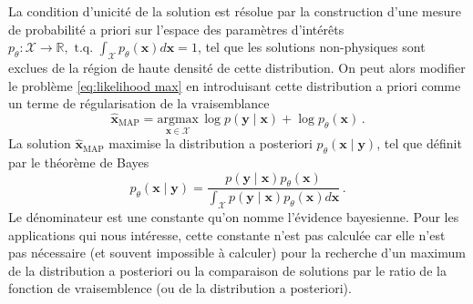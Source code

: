 

La condition d'unicité de la solution est résolue par la construction d'une
mesure de probabilité a priori sur l'espace des paramètres d'intérêts 
$p_\theta: \mathcal{X} \rightarrow \mathbb{R}, \,\, \mathrm{t.q.}\,\, \int_{\mathcal{X}} p_\theta(\mathbf{x}) d\mathbf{x} = 1$,
tel que les solutions non-physiques sont exclues de la région de haute densité de cette distribution.
On peut alors modifier le problème \eqref{eq:likelihood max} en introduisant cette distribution 
a priori comme un terme de régularisation de la vraisemblance
\begin{equation}\label{eq:MAP intro}
        \hat{\mathbf{x}}_{\mathrm{MAP}} = \underset{\mathbf{x} \in \mathcal{X}}{\mathrm{argmax}}\, \log p(\mathbf{y} \mid \mathbf{x}) + \log p_\theta(\mathbf{x})\, .
\end{equation} 
La solution $\hat{\mathbf{x}}_{\mathrm{MAP}}$ maximise la distribution a posteriori $p_\theta(\mathbf{x} \mid \mathbf{y})$, 
tel que définit par le théorème de Bayes
\begin{equation}\label{eq:Bayes}
        p_\theta(\mathbf{x} \mid \mathbf{y}) = \frac{p(\mathbf{y} \mid \mathbf{x}) p_\theta(\mathbf{x})}{\int_{\mathcal{X}} p(\mathbf{\mathbf{y}} \mid \mathbf{x}) p_\theta(\mathbf{x}) d\mathbf{x}}\, .
\end{equation} 
Le dénominateur est une constante qu'on nomme l'évidence bayesienne. 
Pour les applications qui nous intéresse, cette constante n'est pas calculée 
car elle n'est pas nécessaire (et souvent impossible à calculer) 
pour la recherche d'un maximum de la distribution a posteriori ou 
la comparaison de solutions par le ratio de la fonction de vraisemblence (ou de la distribution a posteriori).

